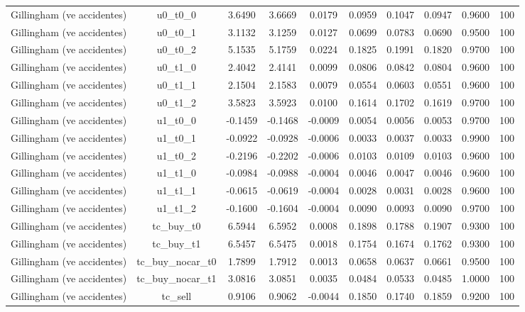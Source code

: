 \begin{table}[htbp]
\begin{tabular}{lccccccccc}
Gillingham (ve accidentes) & u0\_t0\_0 & 3.6490 & 3.6669 & 0.0179 & 0.0959 & 0.1047 & 0.0947 & 0.9600 & 100 \\
Gillingham (ve accidentes) & u0\_t0\_1 & 3.1132 & 3.1259 & 0.0127 & 0.0699 & 0.0783 & 0.0690 & 0.9500 & 100 \\
Gillingham (ve accidentes) & u0\_t0\_2 & 5.1535 & 5.1759 & 0.0224 & 0.1825 & 0.1991 & 0.1820 & 0.9700 & 100 \\
Gillingham (ve accidentes) & u0\_t1\_0 & 2.4042 & 2.4141 & 0.0099 & 0.0806 & 0.0842 & 0.0804 & 0.9600 & 100 \\
Gillingham (ve accidentes) & u0\_t1\_1 & 2.1504 & 2.1583 & 0.0079 & 0.0554 & 0.0603 & 0.0551 & 0.9600 & 100 \\
Gillingham (ve accidentes) & u0\_t1\_2 & 3.5823 & 3.5923 & 0.0100 & 0.1614 & 0.1702 & 0.1619 & 0.9700 & 100 \\
Gillingham (ve accidentes) & u1\_t0\_0 & -0.1459 & -0.1468 & -0.0009 & 0.0054 & 0.0056 & 0.0053 & 0.9700 & 100 \\
Gillingham (ve accidentes) & u1\_t0\_1 & -0.0922 & -0.0928 & -0.0006 & 0.0033 & 0.0037 & 0.0033 & 0.9900 & 100 \\
Gillingham (ve accidentes) & u1\_t0\_2 & -0.2196 & -0.2202 & -0.0006 & 0.0103 & 0.0109 & 0.0103 & 0.9600 & 100 \\
Gillingham (ve accidentes) & u1\_t1\_0 & -0.0984 & -0.0988 & -0.0004 & 0.0046 & 0.0047 & 0.0046 & 0.9600 & 100 \\
Gillingham (ve accidentes) & u1\_t1\_1 & -0.0615 & -0.0619 & -0.0004 & 0.0028 & 0.0031 & 0.0028 & 0.9600 & 100 \\
Gillingham (ve accidentes) & u1\_t1\_2 & -0.1600 & -0.1604 & -0.0004 & 0.0090 & 0.0093 & 0.0090 & 0.9700 & 100 \\
Gillingham (ve accidentes) & tc\_buy\_t0 & 6.5944 & 6.5952 & 0.0008 & 0.1898 & 0.1788 & 0.1907 & 0.9300 & 100 \\
Gillingham (ve accidentes) & tc\_buy\_t1 & 6.5457 & 6.5475 & 0.0018 & 0.1754 & 0.1674 & 0.1762 & 0.9300 & 100 \\
Gillingham (ve accidentes) & tc\_buy\_nocar\_t0 & 1.7899 & 1.7912 & 0.0013 & 0.0658 & 0.0637 & 0.0661 & 0.9500 & 100 \\
Gillingham (ve accidentes) & tc\_buy\_nocar\_t1 & 3.0816 & 3.0851 & 0.0035 & 0.0484 & 0.0533 & 0.0485 & 1.0000 & 100 \\
Gillingham (ve accidentes) & tc\_sell & 0.9106 & 0.9062 & -0.0044 & 0.1850 & 0.1740 & 0.1859 & 0.9200 & 100 \\

\end{tabular}
\end{table}
